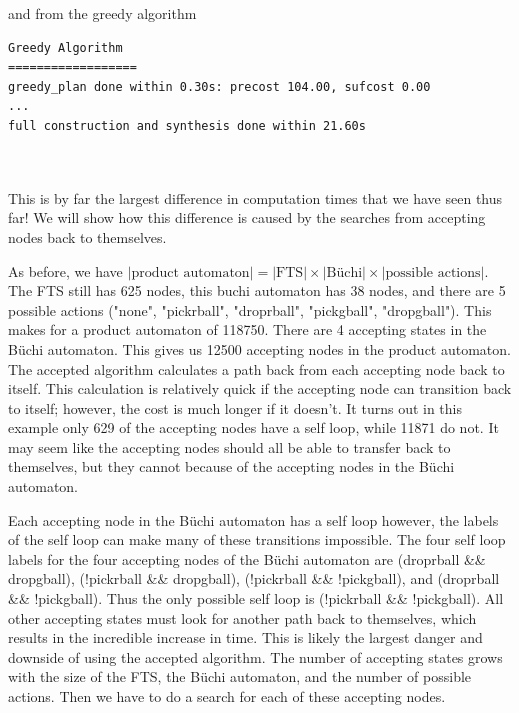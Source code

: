 and from the greedy algorithm \\


\begin{minipage}{\textwidth}
\begingroup
\fontsize{9pt}{12pt}\selectfont
\begin{lstlisting}
Greedy Algorithm
==================
greedy_plan done within 0.30s: precost 104.00, sufcost 0.00
...
full construction and synthesis done within 21.60s
\end{lstlisting} 
\endgroup
\end{minipage} \\ \\


This is by far the largest difference in computation times that we have seen thus far! We will show how this difference is caused by the searches from accepting nodes back to themselves.

As before, we have $|\text{product automaton}| =|\text{FTS}| \times |\text{B\"uchi}| \times |\text{possible actions}|$. The FTS still has 625 nodes, this buchi automaton has 38 nodes, and there are 5 possible actions ("none", "pickrball", "droprball", "pickgball", "dropgball"). This makes for a product automaton of 118750. There are 4 accepting states in the B\"uchi automaton. This gives us 12500 accepting nodes in the product automaton. The accepted algorithm calculates a path back from each accepting node back to itself. This calculation is relatively quick if the accepting node can transition back to itself; however, the cost is much longer if it doesn't. It turns out in this example only 629 of the accepting nodes have a self loop, while 11871 do not. It may seem like the accepting nodes should all be able to transfer back to themselves, but they cannot because of the accepting nodes in the B\"uchi automaton. 

Each accepting node in the B\"uchi automaton has a self loop however, the labels of the self loop can make many of these transitions impossible. The four self loop labels for the four accepting nodes of the B\"uchi automaton are (droprball \&\& dropgball), (!pickrball \&\& dropgball), (!pickrball \&\& !pickgball), and (droprball \&\& !pickgball). Thus the only possible self loop is (!pickrball \&\& !pickgball). All other accepting states must look for another path back to themselves, which results in the incredible increase in time. This is likely the largest danger and downside of using the accepted algorithm. The number of accepting states grows with the size of the FTS, the B\"uchi automaton, and the number of possible actions. Then we have to do a search for each of these accepting nodes.  



